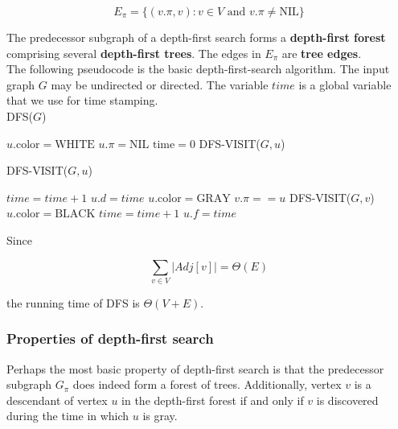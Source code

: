 \documentclass[12pt]{article}
\begin{document}
\begin{equation*}
  E_{\pi} = \{ (v.\pi, v) : v \in V \text{ and } v.\pi \neq \text{NIL} \}
\end{equation*}

The predecessor subgraph of a depth-first search forms a \textbf{depth-first forest} comprising several \textbf{depth-first trees}. The edges in $E_{\pi}$ are \textbf{tree edges}. \\

The following pseudocode is the basic depth-first-search algorithm. The input graph $G$ may be undirected or directed. The variable $time$ is a global variable that we use for time stamping. \\

DFS($G$)
\begin{algorithmic}[1]
	\State $u.\text{color} = \text{WHITE}$
	\State $u.\pi = \text{NIL}$
\EndFor
\State $\text{time} = 0$
		DFS-VISIT($G,u$)
	\EndIf
\EndFor
\end{algorithmic}

DFS-VISIT($G, u$)
\begin{algorithmic}[1]
\State $time = time + 1$
\State $u.d = time$
\State $u.\text{color} = \text{GRAY}$
		\State $v.\pi == u$
		\State DFS-VISIT($G,v$)
	\EndIf
\EndFor
\State $u.\text{color} = \text{BLACK}$
\State $time = time + 1$
\State $u.f = time$
\end{algorithmic}

Since

\begin{equation*}
  \sum_{v \in V} |Adj[v]| = \Theta(E)
\end{equation*}

the running time of DFS is $\Theta(V+E)$. \\

\subsubsection*{Properties of depth-first search}

Perhaps the most basic property of depth-first search is that the predecessor subgraph $G_{\pi}$ does indeed form a forest of trees. Additionally, vertex $v$ is a descendant of vertex $u$ in the depth-first forest if and only if $v$ is discovered during the time in which $u$ is gray. \\
\end{document}
